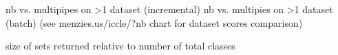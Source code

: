 nb vs. multipipes on >1 dataset (incremental)
nb vs. multipies on >1 dataset (batch)
(see menzies.us/iccle/?nb chart for dataset scores comparison)

size of sets returned relative to number of total classes

